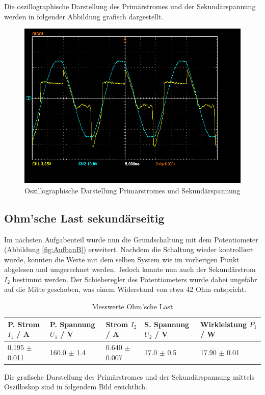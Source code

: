 \documentclass[12pt,a4paper,twoside]{article}
\begin{document}
\noindent
Die oszillographische Darstellung des Primärstromes und der Sekundärspannung werden in folgender Abbildung grafisch dargestellt.

\begin{figure}[H]
    \centering
    \includegraphics[width=0.6\linewidth, angle=0]{nudes/A1 Oszi.jpg}
    \caption{Oszillographische Darstellung Primärstromes und Sekundärspannung}
    \label{fig:OszilloskopA}
\end{figure}


\subsection{Ohm'sche Last sekundärseitig}

Im nächsten Aufgabenteil wurde nun die Grundschaltung mit dem Potentiometer (Abbildung \ref{fig:AufbauB}) erweitert. Nachdem die Schaltung wieder kontrolliert wurde, konnten die Werte mit dem selben System wie im vorherigen Punkt abgelesen und umgerechnet werden.
Jedoch konnte nun auch der Sekundärstrom $I_{2}$ bestimmt werden. Der Schieberegler des Potentiometers wurde dabei ungefähr auf die Mitte geschoben, was einem Widerstand von etwa 42 Ohm entspricht.

\begin{table}[H]
    \centering
    \caption{Messwerte Ohm'sche Last}
    \label{tab:messwerteOhm}
    \begin{tabular}{| l | l | l | l | l |}
        \hline
        P. Strom $I_{1}$ / A  & P. Spannung $U_{1}$ / V & Strom $I_{2}$ / A & S. Spannung $U_{2}$ / V & Wirkleistung $P_{1}$ / W \\
        \hline
        0.195 $\pm$ 0.011 & 160.0 $\pm$ 1.4 & 0.640 $\pm$ 0.007 & 17.0 $\pm$ 0.5 & 17.90 $\pm$ 0.01 \\
        \hline
    \end{tabular}
\end{table}

\noindent
Die grafische Darstellung des Primärstromes und der Sekundärspannung mittels Oszilloskop sind in folgendem Bild ersichtlich.
\end{document}
